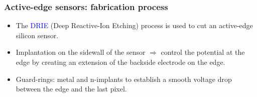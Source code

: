 \begin{frame}
  \frametitle{Active-edge sensors: fabrication process}

  \begin{itemize}
  \item The \textcolor{Blue}{DRIE} (Deep Reactive-Ion Etching) process
    is used to cut an active-edge silicon sensor.
  \item Implantation on the sidewall of the sensor $\Rightarrow$
    control the potential at the edge by creating an extension of the
    backside electrode on the edge.
  \item Guard-rings: metal and n-implants to establish a smooth
    voltage drop between the edge and the last pixel.
  \end{itemize}

  \begin{columns}

\end{columns}
\end{frame}
